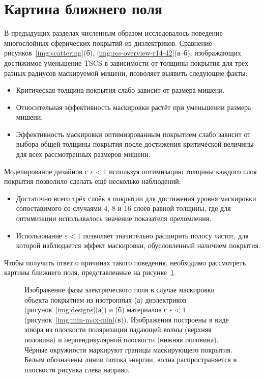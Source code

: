 \section{Картина ближнего поля}\label{sec:near-field}

В предыдущих разделах численным образом исследовалось поведение
многослойных сферических покрытий из диэлектриков. Сравнение
рисунков~\ref{img:scattering}(б), \ref{img:rcs-overview-r14-42}(а--б),
изображающих достижимое уменьшение TSCS в зависимости от толщины
покрытия для трёх разных радиусов маскируемой мишени, позволяет
выявить следующие факты:
\begin{itemize}
\item Критическая толщина покрытия слабо зависит от размера мишени.
\item Относительная эффективность маскировки растёт при уменьшении
  размера мишени.
\item Эффективность маскировки оптимизрованным покрытием слабо зависит
  от выбора общей толщины покрытия после достижения критической
  величины для всех рассмотренных размеров мишени.
\end{itemize}
Моделирование дизайнов с ${\varepsilon<1}$ используя оптимизацию
толщины каждого слоя покрытия позволило сделать ещё несколько
наблюдений:
\begin{itemize}
\item Достаточно всего трёх слоёв в покрытии для достижения уровня
  маскировки сопоставимого со случаями 4, 8 и 16 слоёв равной толщины,
  где для оптимизации использвалось значение показателя преломления.
\item Использование ${\varepsilon<1}$ позволяет значительно расширить
  полосу частот, для которой наблюдается эффект маскировки,
  обусловленный наличием покрытия.
\end{itemize}
Чтобы получить ответ о причинах такого поведения, необходимо
рассмотреть картины ближнего поля, представленные на рисунке~\ref{img:field-phase}.

\begin{figure}
  \begin{minipage}[ht]{0.495\linewidth}
  \end{minipage}
  \hfill
  \begin{minipage}[ht]{0.495\linewidth}
  \end{minipage}
  \caption{Изображение фазы электрического поля в случае маскировки
    объекта покрытием из изотропных (а) диэлектриков
    (рисунок~\ref{img:designs}(а)) и (б) материалов с
    ${\varepsilon <1}$ (рисунок~\ref{img:min-max-min}(в)). Изображения
    построены в виде эпюра из плоскости поляризации падающей волны
    (верхняя половина) и перпендикулярной плоскости (нижняя
    половина). Чёрные окружности маркируют границы маскирующего
    покрытия. Белым обозначены линии потока энергии, волна
    распространяется в плоскости рисунка слева направо.}
  \label{img:field-phase}
\end{figure}

